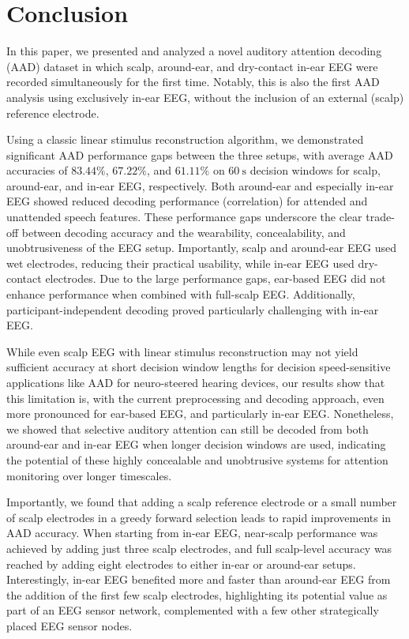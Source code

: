 \documentclass[fleqn,10pt]{wlscirep}
\begin{document}
	
	\section*{Conclusion}
	In this paper, we presented and analyzed a novel auditory attention decoding (AAD) dataset in which scalp, around-ear, and dry-contact in-ear EEG were recorded simultaneously for the first time. Notably, this is also the first AAD analysis using exclusively in-ear EEG, without the inclusion of an external (scalp) reference electrode.
	
	Using a classic linear stimulus reconstruction algorithm, we demonstrated significant AAD performance gaps between the three setups, with average AAD accuracies of $83.44\%$, $67.22\%$, and $61.11\%$ on $\SI{60}{\second}$ decision windows for scalp, around-ear, and in-ear EEG, respectively. Both around-ear and especially in-ear EEG showed reduced decoding performance (correlation) for attended and unattended speech features. These performance gaps underscore the clear trade-off between decoding accuracy and the wearability, concealability, and unobtrusiveness of the EEG setup. Importantly, scalp and around-ear EEG used wet electrodes, reducing their practical usability, while in-ear EEG used dry-contact electrodes. Due to the large performance gaps, ear-based EEG did not enhance performance when combined with full-scalp EEG. Additionally, participant-independent decoding proved particularly challenging with in-ear EEG.
	
	While even scalp EEG with linear stimulus reconstruction may not yield sufficient accuracy at short decision window lengths for decision speed-sensitive applications like AAD for neuro-steered hearing devices, our results show that this limitation is, with the current preprocessing and decoding approach, even more pronounced for ear-based EEG, and particularly in-ear EEG. Nonetheless, we showed that selective auditory attention can still be decoded from both around-ear and in-ear EEG when longer decision windows are used, indicating the potential of these highly concealable and unobtrusive systems for attention monitoring over longer timescales.
	
	Importantly, we found that adding a scalp reference electrode or a small number of scalp electrodes in a greedy forward selection leads to rapid improvements in AAD accuracy. When starting from in-ear EEG, near-scalp performance was achieved by adding just three scalp electrodes, and full scalp-level accuracy was reached by adding eight electrodes to either in-ear or around-ear setups. Interestingly, in-ear EEG benefited more and faster than around-ear EEG from the addition of the first few scalp electrodes, highlighting its potential value as part of an EEG sensor network, complemented with a few other strategically placed EEG sensor nodes.
	
\end{document}
